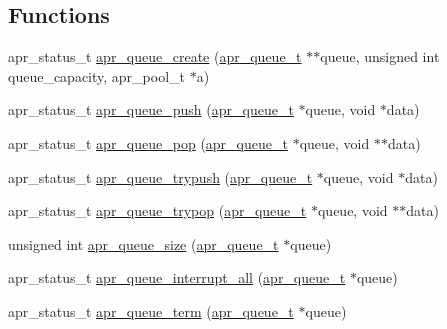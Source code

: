 \subsection*{Functions}
\begin{DoxyCompactItemize}
\item 
apr\-\_\-status\-\_\-t \hyperlink{group___a_p_r___util___f_i_f_o_ga9c8c5ec3d8779a6c2ffffb8b74f784c7}{apr\-\_\-queue\-\_\-create} (\hyperlink{group___a_p_r___util___f_i_f_o_ga8c74c22abf47b63555a2109b06f83abb}{apr\-\_\-queue\-\_\-t} $\ast$$\ast$queue, unsigned int queue\-\_\-capacity, apr\-\_\-pool\-\_\-t $\ast$a)
\item 
apr\-\_\-status\-\_\-t \hyperlink{group___a_p_r___util___f_i_f_o_ga220fffb8eb2f23aa2fe626b64076df88}{apr\-\_\-queue\-\_\-push} (\hyperlink{group___a_p_r___util___f_i_f_o_ga8c74c22abf47b63555a2109b06f83abb}{apr\-\_\-queue\-\_\-t} $\ast$queue, void $\ast$data)
\item 
apr\-\_\-status\-\_\-t \hyperlink{group___a_p_r___util___f_i_f_o_ga302387f5afb71d3c771b76448088bd34}{apr\-\_\-queue\-\_\-pop} (\hyperlink{group___a_p_r___util___f_i_f_o_ga8c74c22abf47b63555a2109b06f83abb}{apr\-\_\-queue\-\_\-t} $\ast$queue, void $\ast$$\ast$data)
\item 
apr\-\_\-status\-\_\-t \hyperlink{group___a_p_r___util___f_i_f_o_gaba8216476d7e5abc3a5ec8a47adf96d5}{apr\-\_\-queue\-\_\-trypush} (\hyperlink{group___a_p_r___util___f_i_f_o_ga8c74c22abf47b63555a2109b06f83abb}{apr\-\_\-queue\-\_\-t} $\ast$queue, void $\ast$data)
\item 
apr\-\_\-status\-\_\-t \hyperlink{group___a_p_r___util___f_i_f_o_ga128207222433384f286f61ec806f4af8}{apr\-\_\-queue\-\_\-trypop} (\hyperlink{group___a_p_r___util___f_i_f_o_ga8c74c22abf47b63555a2109b06f83abb}{apr\-\_\-queue\-\_\-t} $\ast$queue, void $\ast$$\ast$data)
\item 
unsigned int \hyperlink{group___a_p_r___util___f_i_f_o_gaf342a2e2ec195a30d6d8c9d95fbfbc30}{apr\-\_\-queue\-\_\-size} (\hyperlink{group___a_p_r___util___f_i_f_o_ga8c74c22abf47b63555a2109b06f83abb}{apr\-\_\-queue\-\_\-t} $\ast$queue)
\item 
apr\-\_\-status\-\_\-t \hyperlink{group___a_p_r___util___f_i_f_o_ga8757c7f87105e6ff4cf1ea5ac28dd26f}{apr\-\_\-queue\-\_\-interrupt\-\_\-all} (\hyperlink{group___a_p_r___util___f_i_f_o_ga8c74c22abf47b63555a2109b06f83abb}{apr\-\_\-queue\-\_\-t} $\ast$queue)
\item 
apr\-\_\-status\-\_\-t \hyperlink{group___a_p_r___util___f_i_f_o_gabb8115bceb96a41df3e21544ce79bc68}{apr\-\_\-queue\-\_\-term} (\hyperlink{group___a_p_r___util___f_i_f_o_ga8c74c22abf47b63555a2109b06f83abb}{apr\-\_\-queue\-\_\-t} $\ast$queue)
\end{DoxyCompactItemize}



